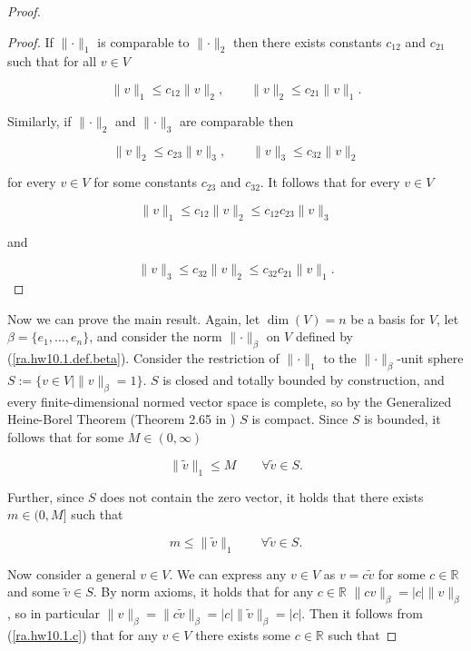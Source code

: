 \begin{proof}
\begin{proof}
If \(\lVert \cdot \rVert_1\) is comparable to \(\lVert \cdot \rVert_2\) then there exists constants \(c_{12}\) and \(c_{21}\) such that for all \(v \in V\)

\[
\lVert v \rVert_1 \leq c_{12} \lVert v \rVert_2, \qquad \lVert v \rVert_2 \leq c_{21} \lVert v \rVert_1.
\]

Similarly, if \(\lVert \cdot \rVert_2\) and \(\lVert \cdot \rVert_3\) are comparable then 

\[
\lVert v \rVert_2 \leq c_{23} \lVert v \rVert_3, \qquad \lVert v \rVert_3 \leq c_{32} \lVert v \rVert_2
\]

for every \( v \in V\) for some constants \(c_{23}\) and \(c_{32}\). It follows that for every \(v \in V\)

\[
\lVert v \rVert_1 \leq c_{12} \lVert v \rVert_2 \leq c_{12} c_{23} \lVert v \rVert_3
\]

and

\[
 \lVert v \rVert_3 \leq c_{32} \lVert v \rVert_2 \leq c_{32} c_{21} \lVert v \rVert_1.
\]

\end{proof}

Now we can prove the main result. Again, let \(\dim(V) = n\) be a basis for \(V\), let \(\beta = \{e_1, \ldots, e_n\}\), and consider the norm \(\lVert \cdot \rVert_\beta\) on \(V\) defined by (\ref{ra.hw10.1.def.beta}). Consider the restriction of \(\lVert \cdot \rVert_1\) to the \(\lVert \cdot \rVert_\beta\)-unit sphere \(S := \{v \in V| \lVert v \rVert_\beta = 1\}\). \(S\) is closed and totally bounded by construction, and every finite-dimensional normed vector space is complete, so by the Generalized Heine-Borel Theorem (Theorem 2.65 in \citet{pugh2015real}) \(S\) is compact. Since \(S\) is bounded, it follows that for some \(M \in (0, \infty)\)

\begin{equation}\label{ra.hw10.1.c}
\lVert \tilde{v} \rVert_1 \leq M \qquad \forall \tilde{v} \in S.
\end{equation}

Further, since \(S\) does not contain the zero vector, it holds that there exists \(m \in (0, M]\) such that 

\begin{equation}\label{ra.hw10.1.d}
m \leq \lVert \tilde{v} \rVert_1 \qquad \forall \tilde{v} \in S.
\end{equation}

Now consider a general \(v \in V\). We can express any \(v \in V\) as \(v = c \tilde{v}\) for some \(c \in \mathbb{R}\) and some \(\tilde{v} \in S\). By norm axioms, it holds that for any \(c \in \mathbb{R}\) \(\lVert c v \rVert_\beta = |c| \lVert  v \rVert_\beta\), so in particular \(\lVert v \rVert_\beta = \lVert c \tilde{v} \rVert_\beta = |c| \lVert  \tilde{v} \rVert_\beta = |c|\). Then it follows from (\ref{ra.hw10.1.c}) that for any \(v \in V\) there exists some \(c \in \mathbb{R}\) such that


\end{proof}
